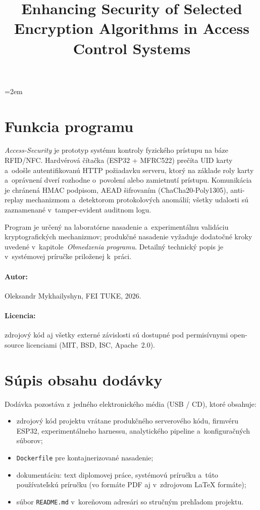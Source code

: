 \documentclass[a4paper]{feidippp}
\title{Enhancing Security of Selected Encryption Algorithms in Access Control Systems}
\begin{document}


\sloppy
\emergencystretch=2em



\titulnastrana

\newpage


\tableofcontents



\newpage

\setcounter{page}{1}

\section{Funkcia programu}

\emph{Access-Security} je prototyp systému kontroly fyzického prístupu na báze RFID/NFC. Hardvérová čítačka (ESP32 + MFRC522) prečíta UID karty a~odošle autentifikovanú HTTP požiadavku serveru, ktorý na základe roly karty a~oprávnení dverí rozhodne o~povolení alebo zamietnutí prístupu. Komunikácia je chránená HMAC podpisom, AEAD šifrovaním (ChaCha20-Poly1305), anti-replay mechanizmom a~detektorom protokolových anomálií; všetky udalosti sú zaznamenané v~tamper-evident auditnom logu.

Program je určený na laboratórne nasadenie a~experimentálnu validáciu kryptografických mechanizmov; produkčné nasadenie vyžaduje dodatočné kroky uvedené v~kapitole~\emph{Obmedzenia programu}. Detailný technický popis je v~systémovej príručke priloženej k~práci.

\paragraph{Autor:} Oleksandr Mykhailyshyn, FEI TUKE, 2026.

\paragraph{Licencia:} zdrojový kód aj všetky externé závislosti sú dostupné pod permisívnymi open-source licenciami (MIT, BSD, ISC, Apache~2.0).


\section{Súpis obsahu dodávky}

Dodávka pozostáva z~jedného elektronického média (USB / CD), ktoré obsahuje:

\begin{itemize}
\item zdrojový kód projektu vrátane produkčného serverového kódu, firmvéru ESP32, experimentálneho harnessu, analytického pipeline a~konfiguračných súborov;
\item \texttt{Dockerfile} pre kontajnerizované nasadenie;
\item dokumentáciu: text diplomovej práce, systémovú príručku a~túto používateľskú príručku (vo formáte PDF aj v~zdrojovom \LaTeX{} formáte);
\item súbor \texttt{README.md} v~koreňovom adresári so stručným prehľadom projektu.
\end{itemize}
\end{document}
